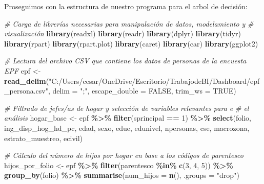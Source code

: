 \documentclass[
]{article}
\newenvironment{Shaded}{\begin{snugshade}}{\end{snugshade}}
\newcommand{\AttributeTok}[1]{\textcolor[rgb]{0.13,0.29,0.53}{#1}}
\newcommand{\CommentTok}[1]{\textcolor[rgb]{0.56,0.35,0.01}{\textit{#1}}}
\newcommand{\ConstantTok}[1]{\textcolor[rgb]{0.56,0.35,0.01}{#1}}
\newcommand{\DecValTok}[1]{\textcolor[rgb]{0.00,0.00,0.81}{#1}}
\newcommand{\FunctionTok}[1]{\textcolor[rgb]{0.13,0.29,0.53}{\textbf{#1}}}
\newcommand{\NormalTok}[1]{#1}
\newcommand{\OtherTok}[1]{\textcolor[rgb]{0.56,0.35,0.01}{#1}}
\newcommand{\SpecialCharTok}[1]{\textcolor[rgb]{0.81,0.36,0.00}{\textbf{#1}}}
\newcommand{\StringTok}[1]{\textcolor[rgb]{0.31,0.60,0.02}{#1}}
\begin{document}
Proseguimos con la estructura de nuestro programa para el arbol de
decisión:

\begin{Shaded}
\begin{Highlighting}[]
\CommentTok{\# Carga de librerías necesarias para manipulación de datos, modelamiento y }
\CommentTok{\# visualización}
\FunctionTok{library}\NormalTok{(readxl)}
\FunctionTok{library}\NormalTok{(readr)}
\FunctionTok{library}\NormalTok{(dplyr)}
\FunctionTok{library}\NormalTok{(tidyr)}
\FunctionTok{library}\NormalTok{(rpart)}
\FunctionTok{library}\NormalTok{(rpart.plot)}
\FunctionTok{library}\NormalTok{(caret)}
\FunctionTok{library}\NormalTok{(car)}
\FunctionTok{library}\NormalTok{(ggplot2)}

\CommentTok{\# Lectura del archivo CSV que contiene los datos de personas de la encuesta EPF}
\NormalTok{epf }\OtherTok{\textless{}{-}} \FunctionTok{read\_delim}\NormalTok{(}\StringTok{"C:/Users/cesar/OneDrive/Escritorio/TrabajodeBI/Dashboard/epf\_persona.csv"}\NormalTok{, }\AttributeTok{delim =} \StringTok{";"}\NormalTok{,}
                  \AttributeTok{escape\_double =} \ConstantTok{FALSE}\NormalTok{, }\AttributeTok{trim\_ws =} \ConstantTok{TRUE}\NormalTok{)}

\CommentTok{\# Filtrado de jefes/as de hogar y selección de variables relevantes para e}
\CommentTok{\# el análisis}
\NormalTok{hogar\_base }\OtherTok{\textless{}{-}}\NormalTok{ epf }\SpecialCharTok{\%\textgreater{}\%}
  \FunctionTok{filter}\NormalTok{(sprincipal }\SpecialCharTok{==} \DecValTok{1}\NormalTok{) }\SpecialCharTok{\%\textgreater{}\%}
  \FunctionTok{select}\NormalTok{(folio, ing\_disp\_hog\_hd\_pc, edad, sexo, edue, edunivel,}
\NormalTok{         npersonas, cse, macrozona, estrato\_muestreo, ecivil)}

\CommentTok{\# Cálculo del número de hijos por hogar en base a los códigos de parentesco}
\NormalTok{hijos\_por\_folio }\OtherTok{\textless{}{-}}\NormalTok{ epf }\SpecialCharTok{\%\textgreater{}\%}
  \FunctionTok{filter}\NormalTok{(parentesco }\SpecialCharTok{\%in\%} \FunctionTok{c}\NormalTok{(}\DecValTok{3}\NormalTok{, }\DecValTok{4}\NormalTok{, }\DecValTok{5}\NormalTok{)) }\SpecialCharTok{\%\textgreater{}\%}
  \FunctionTok{group\_by}\NormalTok{(folio) }\SpecialCharTok{\%\textgreater{}\%}
  \FunctionTok{summarise}\NormalTok{(}\AttributeTok{num\_hijos =} \FunctionTok{n}\NormalTok{(), }\AttributeTok{.groups =} \StringTok{"drop"}\NormalTok{)}


\end{Highlighting}
\end{Shaded}
\end{document}
